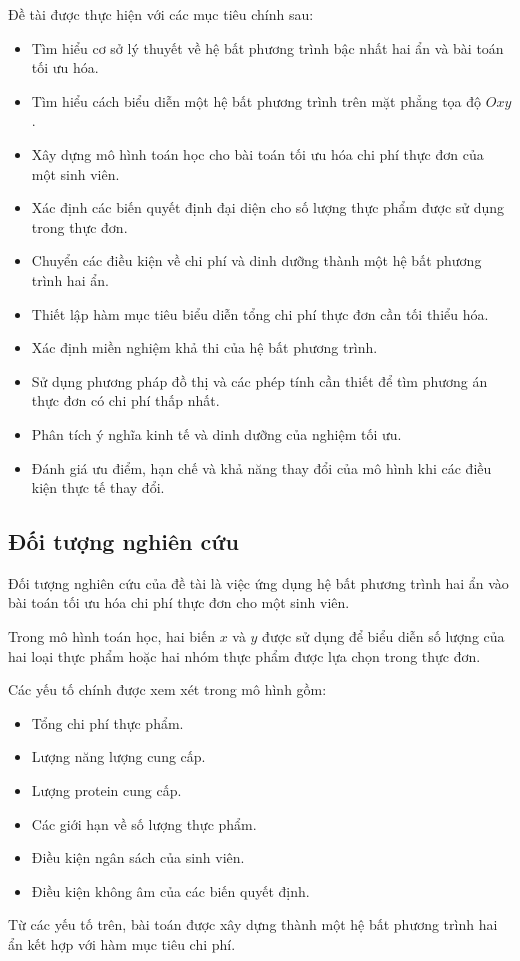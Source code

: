 \documentclass[12pt,a4paper]{article}
\begin{document}
Đề tài được thực hiện với các mục tiêu chính sau:
\begin{itemize}
    \item Tìm hiểu cơ sở lý thuyết về hệ bất phương trình bậc nhất hai ẩn và bài toán tối ưu hóa.
    \item Tìm hiểu cách biểu diễn một hệ bất phương trình trên mặt phẳng tọa độ $Oxy$.
    \item Xây dựng mô hình toán học cho bài toán tối ưu hóa chi phí thực đơn của một sinh viên.
    \item Xác định các biến quyết định đại diện cho số lượng thực phẩm được sử dụng trong thực đơn.
    \item Chuyển các điều kiện về chi phí và dinh dưỡng thành một hệ bất phương trình hai ẩn.
    \item Thiết lập hàm mục tiêu biểu diễn tổng chi phí thực đơn cần tối thiểu hóa.
    \item Xác định miền nghiệm khả thi của hệ bất phương trình.
    \item Sử dụng phương pháp đồ thị và các phép tính cần thiết để tìm phương án thực đơn có chi phí thấp nhất.
    \item Phân tích ý nghĩa kinh tế và dinh dưỡng của nghiệm tối ưu.
    \item Đánh giá ưu điểm, hạn chế và khả năng thay đổi của mô hình khi các điều kiện thực tế thay đổi.
\end{itemize}



\subsection{Đối tượng nghiên cứu}

Đối tượng nghiên cứu của đề tài là việc ứng dụng hệ bất phương trình hai ẩn vào bài toán tối ưu hóa chi phí thực đơn cho một sinh viên.

Trong mô hình toán học, hai biến $x$ và $y$ được sử dụng để biểu diễn số lượng của hai loại thực phẩm hoặc hai nhóm thực phẩm được lựa chọn trong thực đơn.

Các yếu tố chính được xem xét trong mô hình gồm:

\begin{itemize}
    \item Tổng chi phí thực phẩm.
    \item Lượng năng lượng cung cấp.
    \item Lượng protein cung cấp.
    \item Các giới hạn về số lượng thực phẩm.
    \item Điều kiện ngân sách của sinh viên.
    \item Điều kiện không âm của các biến quyết định.
\end{itemize}
Từ các yếu tố trên, bài toán được xây dựng thành một hệ bất phương trình hai ẩn kết hợp với hàm mục tiêu chi phí.
\end{document}
